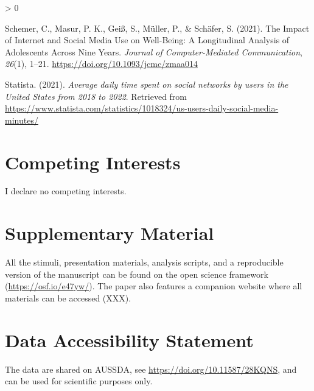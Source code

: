 \documentclass[
  english,
  man,floatsintext]{apa6}
\newlength{\cslhangindent}
\newenvironment{CSLReferences}[2] %
 {%
  \setlength{\parindent}{0pt}
  \ifodd #1 \everypar{\setlength{\hangindent}{\cslhangindent}}\ignorespaces\fi
  \ifnum #2 > 0
  \setlength{\parskip}{#2\baselineskip}
  \fi
 }%
 {}
\begin{document}
\begin{CSLReferences}{1}{0}
\leavevmode\hypertarget{ref-schemerImpactInternetSocial2021}{}%
Schemer, C., Masur, P. K., Geiß, S., Müller, P., \& Schäfer, S. (2021). The {Impact} of {Internet} and {Social} {Media} {Use} on {Well}-{Being}: {A} {Longitudinal} {Analysis} of {Adolescents} {Across} {Nine} {Years}. \emph{Journal of Computer-Mediated Communication}, \emph{26}(1), 1--21. \url{https://doi.org/10.1093/jcmc/zmaa014}

\leavevmode\hypertarget{ref-statistaAverageDailyTime2021}{}%
Statista. (2021). \emph{Average daily time spent on social networks by users in the {United} {States} from 2018 to 2022}. Retrieved from \url{https://www.statista.com/statistics/1018324/us-users-daily-social-media-minutes/}

\end{CSLReferences}

\hypertarget{competing-interests}{%
\section{Competing Interests}\label{competing-interests}}

I declare no competing interests.

\hypertarget{supplementary-material}{%
\section{Supplementary Material}\label{supplementary-material}}

All the stimuli, presentation materials, analysis scripts, and a reproducible version of the manuscript can be found on the open science framework (\url{https://osf.io/e47yw/}). The paper also features a companion website where all materials can be accessed (XXX).

\hypertarget{data-accessibility-statement}{%
\section{Data Accessibility Statement}\label{data-accessibility-statement}}

The data are shared on AUSSDA, see \url{https://doi.org/10.11587/28KQNS}, and can be used for scientific purposes only.
\end{document}
